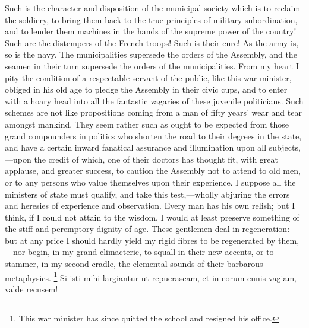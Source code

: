 Such is the character and disposition of the municipal society which is to reclaim the soldiery, to bring them back to the true principles of military subordination, and to lender them machines in the hands of the supreme power of the country! Such are the distempers of the French troops! Such is their cure! As the army is, so is the navy. The municipalities supersede the orders of the Assembly, and the seamen in their turn supersede the orders of the municipalities. From my heart I pity the condition of a respectable servant of the public, like this war minister, obliged in his old age to pledge the Assembly in their civic cups, and to enter with a hoary head into all the fantastic vagaries of these juvenile politicians. Such schemes are not like propositions coming from a man of fifty years' wear and tear amongst mankind. They seem rather such as ought to be expected from those grand compounders in politics who shorten the road to their degrees in the state, and have a certain inward fanatical assurance and illumination upon all subjects,—upon the credit of which, one of their doctors has thought fit, with great applause, and greater success, to caution the Assembly not to attend to old men, or to any persons who value themselves upon their experience. I suppose all the ministers of state must qualify, and take this test,—wholly abjuring the errors and heresies of experience and observation. Every man has his own relish; but I think, if I could not attain to the wisdom, I would at least preserve something of the stiff and peremptory dignity of age. These gentlemen deal in regeneration: but at any price I should hardly yield my rigid fibres to be regenerated by them,—nor begin, in my grand climacteric, to squall in their new accents, or to stammer, in my second cradle, the elemental sounds of their barbarous metaphysics.
\footnote{ This war minister has since quitted the school and resigned his office.}
 Si isti mihi largiantur ut repuerascam, et in eorum cunis vagiam, valde recusem!

